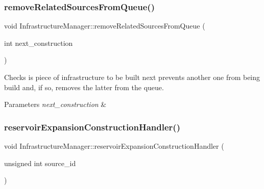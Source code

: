 \subsubsection{\texorpdfstring{remove\+Related\+Sources\+From\+Queue()}{removeRelatedSourcesFromQueue()}}
{\footnotesize\ttfamily void Infrastructure\+Manager\+::remove\+Related\+Sources\+From\+Queue (\begin{DoxyParamCaption}\item[{int}]{next\+\_\+construction }\end{DoxyParamCaption})}

Checks is piece of infrastructure to be built next prevents another one from being build and, if so, removes the latter from the queue. 
\begin{DoxyParams}{Parameters}
{\em next\+\_\+construction} & \\
\hline
\end{DoxyParams}
\mbox{\label{classInfrastructureManager_ad4dc157110b29560cd47501ba67bcba3_ad4dc157110b29560cd47501ba67bcba3}} 
\subsubsection{\texorpdfstring{reservoir\+Expansion\+Construction\+Handler()}{reservoirExpansionConstructionHandler()}}
{\footnotesize\ttfamily void Infrastructure\+Manager\+::reservoir\+Expansion\+Construction\+Handler (\begin{DoxyParamCaption}\item[{unsigned int}]{source\+\_\+id }\end{DoxyParamCaption})}

\mbox{\label{classInfrastructureManager_a9972a27ff6d08b7c1226d703ac700a94_a9972a27ff6d08b7c1226d703ac700a94}} 
